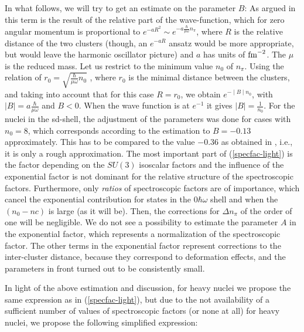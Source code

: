 \documentclass[12pt]{article}
\begin{document}
In what follows, we will try to get an estimate on the parameter
$B$: As argued in \cite{specfac-draayer} this term is the result of the relative part of the wave-function, which 
for zero angular momentum is proportional to 
$e^{-aR^2} \sim e^{-a\frac{\hbar}{\mu \omega} n_\pi}			 $, where
$R$ is the relative distance of the two clusters (though, an $e^{-a R}$ ansatz 
would be more appropriate, but would leave the harmonic oscillator picture)
and $a$ has units of $\rm{fm}^{-2}$. 
The $\mu$ is the reduced mass. Let us
restrict to the minimum value $n_0$ of $n_\pi$. Using the relation of 
$r_0 = \sqrt{\frac{\hbar}{\mu\omega}n_0}$ \cite{geom}, where $r_0$ is
the minimal distance between the clusters, and taking
into account that for this case $R=r_0$, we obtain
$e^{-\mid B\mid n_0}$, with 
$\mid B\mid = a\frac{\hbar}{\mu\omega}$
and $B<0$.
When the wave function is at $e^{-1}$ it gives 
$\mid B\mid =\frac{1}{n_0}$. 
For the nuclei in the sd-shell, the 
adjustment of the parameters was done for cases with $n_0=8$,
which corresponds according to the estimation to $B = -0.13$ 
approximately. This has to be compared to the value  $-0.36$ as obtained in 
\cite{specfac-draayer}, i.e., it is only a rough approximation. The most
important part of (\ref{specfac-light}) is the factor
depending on the $SU(3)$ isoscalar factors and
the influence of the exponential factor is not dominant for the relative structure of the
spectroscopic factors.
Furthermore, only {\it ratios} of spectroscopic factors are of importance,
which cancel the exponential contribution for states in the $0\hbar\omega$
shell and when the $(n_0-nc)$ is large (as it will be). Then, the corrections
for $\Delta n_\pi$ of the order of one will be negligible.
We do not see a possibility to estimate the parameter $A$ in
the exponential factor, which represents a normalization
of the spectroscopic factor.
The other terms in the exponential factor represent corrections
to the inter-cluster distance, because they correspond
to deformation effects, and the parameters in front turned out
to be consistently small. 

In light of the above estimation and discussion, 
for heavy nuclei we propose the same expression as
in (\ref{specfac-light}), but due to the not availability 
of a sufficient number of values of spectroscopic factors (or none at all)
for heavy nuclei, we propose the following simplified expression:
\end{document}
